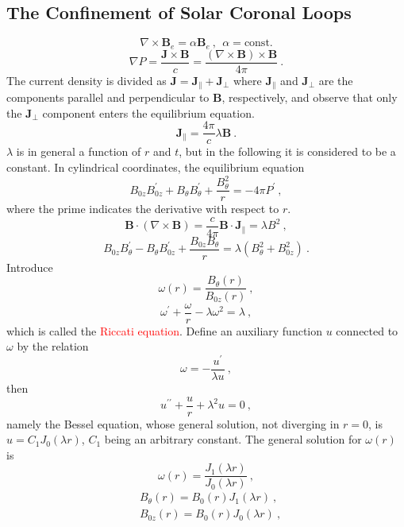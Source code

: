 \documentclass[12pt,a4paper]{article}
\renewcommand{\vec}[1]{\boldsymbol{#1}}
\begin{document}
\subsection{The Confinement of Solar Coronal Loops}
\begin{equation*}
\nabla \times \vec{B}_e = \alpha \vec{B}_e ~, ~~\alpha = \text{const.} 
\end{equation*}
\begin{equation*}
\nabla P = \frac{\vec{J}\times \vec{B}}{c} = \frac{(\nabla \times \vec{B}) \times \vec{B} }{4\pi} ~.
\end{equation*}
The current density is divided as $\vec{J} = \vec{J}_\parallel + \vec{J}_\perp$ where $\vec{J}_\parallel$ and $\vec{J}_\perp$ are the components parallel and perpendicular to $\vec{B}$, respectively, and observe that only the $\vec{J}_\perp$ component enters the equilibrium equation.
\begin{equation*}
\vec{J}_\parallel = \frac{4\pi}{c} \lambda \vec{B} ~.
\end{equation*}
$\lambda$ is in general a function of $r$ and $t$, but in the following it is considered to be a constant. In cylindrical coordinates, the equilibrium equation
\begin{equation}
B_{0z} B_{0z}^\prime +B_{\theta} B_{\theta}^\prime +\frac{B_\theta^2}{r} = -4\pi P^\prime ~,
\end{equation}
where the prime indicates the derivative with respect to $r$.
\begin{equation*}
\vec{B} \cdot (\nabla \times \vec{B}) = \frac{c}{4\pi}  \vec{B} \cdot \vec{J}_\parallel = \lambda B^2 ~,
\end{equation*}
\begin{equation}
B_{0z} B_{\theta}^\prime -B_{\theta}B_{0z}^\prime +\frac{ B_{0z} B_{\theta}}{r} = \lambda (B_{\theta}^2 +B_{0z}^2) ~.
\end{equation}
Introduce 
\begin{equation*}
\omega(r) = \frac{B_{\theta}(r)}{B_{0z}(r)} ~,
\end{equation*}
\begin{equation}
\omega^\prime +\frac{\omega}{r} -\lambda \omega^2 = \lambda ~,
\end{equation}
which is called the \textcolor{red}{Riccati equation}. Define an auxiliary function $u$ connected to $\omega$ by the relation
\begin{equation*}
\omega = -\frac{u^\prime}{\lambda u} ~,
\end{equation*}
then
\begin{equation*}
u^{\prime\prime} +\frac{u}{r} +\lambda^2 u = 0 ~,
\end{equation*}
namely the Bessel equation, whose general solution, not diverging in $r = 0$, is $u = C_1 J_0(\lambda r)$, $C_1$ being an arbitrary constant. The general solution for $\omega(r)$ is
\begin{equation*}
\omega(r) = \dfrac{J_1(\lambda r)}{J_0(\lambda r) } ~,
\end{equation*}
\begin{align}
& B_{\theta}(r) = B_{0}(r) J_1(\lambda r) ~, \\
& B_{0z}(r) = B_{0}(r) J_0(\lambda r) ~,
\end{align}
\end{document}
